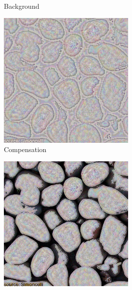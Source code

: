 \begin{figure}[]
\begin{subfigure}{\textwidth}
\begin{subfigure}{0.24\textwidth}
            \caption{Background}
            \label{fig:ex01-pebbles-5steps-threshold_bg}
        \end{subfigure}
        \hfill
        \begin{subfigure}{0.24\textwidth}
            \centering
            \includegraphics[width=\textwidth]{images/04-experiment01/pebbles/5/threshold_im.jpg}
            \caption{Compensation}
            \label{fig:ex01-pebbles-5steps-threshold_im}
        \end{subfigure}
        \hfill
        \begin{subfigure}{0.24\textwidth}
            \centering
            \includegraphics[width=\textwidth]{images/04-experiment01/pebbles/5/threshold_proj.jpg}

\end{subfigure}
\end{subfigure}
\end{figure}
